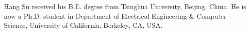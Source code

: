 \documentclass[journal]{IEEEtran}
\begin{document}
\ifCLASSOPTIONcaptionsoff
  \newpage
\fi



%



%

 
\begin{IEEEbiography}%
{Hang Su} received his B.E. degree from Tsinghua University, Beijing, China.
He is now a Ph.D. student in Department of Electrical Engineering \& Computer Science, 
University of California, Berkeley, CA, USA.
\end{IEEEbiography}
\end{document}
